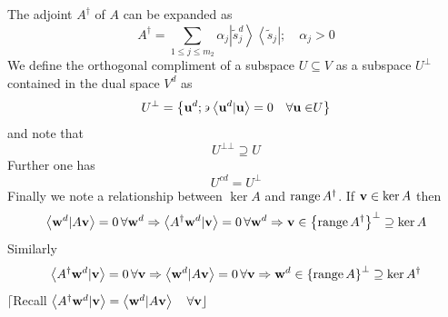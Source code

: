 The adjoint $A^{\dagger }$ of $A$ can be expanded as 
\begin{equation}
A^{\dagger }=\sum_{1\leq j\leq m_{2}}\alpha _{j}\left\vert \tilde{s}%
_{j}^{d}\right\rangle \left\langle \tilde{s}_{j}\right\vert ;\quad \alpha
_{j}>0
\end{equation}%
We define the orthogonal compliment of a subspace $U\subseteq V$ as a
subspace $U^{\bot }$ contained in the dual space $V^{d}$ as 
\begin{equation}
U^{\bot }=\left\{ {\bf u}^{d};\backepsilon \left\langle {\bf u}^{d}|{\bf u}%
\right\rangle =0\quad \forall {\bf u\in }U\right\}
\end{equation}%
and note that 
\begin{equation}
U^{\bot \bot }\supseteq U
\end{equation}%
Further one has 
\begin{equation}
U^{cd}=U^{\bot }
\end{equation}%
Finally we note a relationship between $\ker A$ and $%
\mathop{\rm range}%
A^{\dagger }$. If ${\bf v}\in \ker A$ then%
\begin{equation}
\left\langle {\bf w}^{d}|A{\bf v}\right\rangle =0\,\forall {\bf w}%
^{d}\Rightarrow \left\langle A^{\dagger }{\bf w}^{d}|{\bf v}\right\rangle
=0\,\forall {\bf w}^{d}\Rightarrow {\bf v}\in \left\{ 
\mathop{\rm range}%
A^{\dagger }\right\} ^{\bot }\supseteq \ker A
\end{equation}%
Similarly 
\begin{equation}
\left\langle A^{\dagger }{\bf w}^{d}|{\bf v}\right\rangle =0\,\forall {\bf v}%
\Rightarrow \left\langle {\bf w}^{d}|A{\bf v}\right\rangle =0\,\forall {\bf v%
}\Rightarrow {\bf w}^{d}\in \left\{ 
\mathop{\rm range}%
A\right\} ^{\bot }\supseteq \ker A^{\dagger }
\end{equation}%
$\lceil $Recall $\left\langle A^{\dagger }{\bf w}^{d}|{\bf v}\right\rangle
=\left\langle {\bf w}^{d}|A{\bf v}\right\rangle \quad \forall {\bf v\rfloor }%
\ \ $

